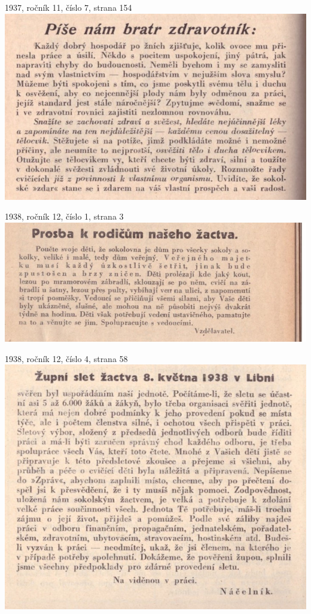 \documentclass[11pt]{article}
\begin{document}
1937, ročník 11, číslo 7, strana 154 \\
\includegraphics[width=\imagewidth]{original/1937/Skener_20250325 (6).jpg}



\clearpage

1938, ročník 12, číslo 1, strana 3 \\
\includegraphics[width=\imagewidth]{original/1938/Skener_20250318.jpg}

1938, ročník 12, číslo 4, strana 58 \\
\includegraphics[width=\imagewidth]{original/1938/Skener_20250318 (2).jpg}
\end{document}
